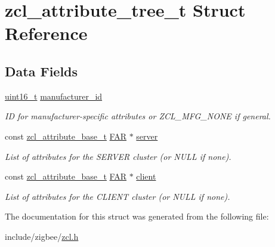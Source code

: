 \hypertarget{structzcl__attribute__tree__t}{\section{zcl\-\_\-attribute\-\_\-tree\-\_\-t Struct Reference}
\label{structzcl__attribute__tree__t}
}
\subsection*{Data Fields}
\begin{DoxyCompactItemize}
\item 
\hypertarget{group__zcl_ga4ad31fcb69f8aaca8f3c1820bb4d8594}{\hyperlink{group__hal_ga5a8b2dc9e45a9ee81a94ef304fb62505}{uint16\-\_\-t} \hyperlink{group__zcl_ga4ad31fcb69f8aaca8f3c1820bb4d8594}{manufacturer\-\_\-id}}\label{group__zcl_ga4ad31fcb69f8aaca8f3c1820bb4d8594}

\begin{DoxyCompactList}\small\item\em I\-D for manufacturer-\/specific attributes or Z\-C\-L\-\_\-\-M\-F\-G\-\_\-\-N\-O\-N\-E if general. \end{DoxyCompactList}\item 
\hypertarget{group__zcl_ga711c76cba8f7c0f30a95dcc5f7c0b7fb}{const \hyperlink{structzcl__attribute__base__t}{zcl\-\_\-attribute\-\_\-base\-\_\-t} \hyperlink{group__hal_gaef060b3456fdcc093a7210a762d5f2ed}{F\-A\-R} $\ast$ \hyperlink{group__zcl_ga711c76cba8f7c0f30a95dcc5f7c0b7fb}{server}}\label{group__zcl_ga711c76cba8f7c0f30a95dcc5f7c0b7fb}

\begin{DoxyCompactList}\small\item\em List of attributes for the S\-E\-R\-V\-E\-R cluster (or N\-U\-L\-L if none). \end{DoxyCompactList}\item 
\hypertarget{group__zcl_gabb37e65dc5e6f9179ff1c17268031d9b}{const \hyperlink{structzcl__attribute__base__t}{zcl\-\_\-attribute\-\_\-base\-\_\-t} \hyperlink{group__hal_gaef060b3456fdcc093a7210a762d5f2ed}{F\-A\-R} $\ast$ \hyperlink{group__zcl_gabb37e65dc5e6f9179ff1c17268031d9b}{client}}\label{group__zcl_gabb37e65dc5e6f9179ff1c17268031d9b}

\begin{DoxyCompactList}\small\item\em List of attributes for the C\-L\-I\-E\-N\-T cluster (or N\-U\-L\-L if none). \end{DoxyCompactList}\end{DoxyCompactItemize}


The documentation for this struct was generated from the following file\-:\begin{DoxyCompactItemize}
\item 
include/zigbee/\hyperlink{zcl_8h}{zcl.\-h}\end{DoxyCompactItemize}
